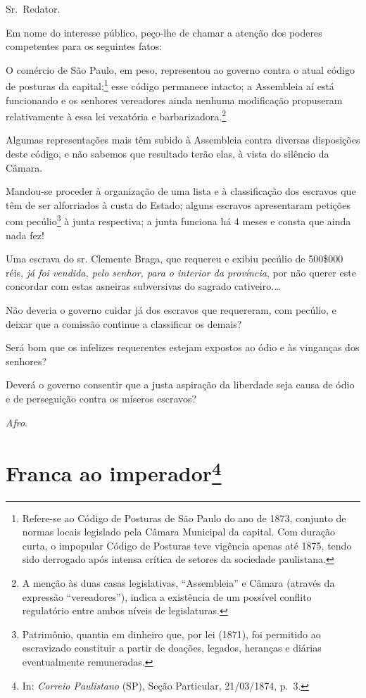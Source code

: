 \asterisc{}

Sr.~Redator.

Em nome do interesse público, peço-lhe de chamar a atenção dos poderes
competentes para os seguintes fatos:

O comércio de São Paulo, em peso, representou ao governo contra o atual
código de posturas da capital;\footnote{ Refere-se ao Código de
  Posturas de São Paulo do ano de 1873, conjunto de normas locais
  legislado pela Câmara Municipal da capital. Com duração curta, o
  impopular Código de Posturas teve vigência apenas até 1875, tendo sido
  derrogado após intensa crítica de setores da sociedade paulistana.}
esse código permanece intacto; a Assembleia aí está funcionando e os
senhores vereadores ainda nenhuma modificação propuseram relativamente à
essa lei vexatória e barbarizadora.\footnote{ A menção às duas casas
  legislativas, ``Assembleia'' e Câmara (através da expressão
  ``vereadores''), indica a existência de um possível conflito regulatório
  entre ambos níveis de legislaturas.}

Algumas representações mais têm subido à Assembleia contra diversas
disposições deste código, e não sabemos que resultado terão elas, à
vista do silêncio da Câmara.

Mandou-se proceder à organização de uma lista e à classificação dos
escravos que têm de ser alforriados à custa do Estado; alguns escravos
apresentaram petições com pecúlio\footnote{ Patrimônio, quantia em
  dinheiro que, por lei (1871), foi permitido ao escravizado constituir
  a partir de doações, legados, heranças e diárias eventualmente
  remuneradas.} à junta respectiva; a junta funciona há 4 meses e consta
que ainda nada fez!

Uma escrava do sr. Clemente Braga, que requereu e exibiu pecúlio de
500\$000 réis, \emph{já foi vendida, pelo senhor, para o interior da
província}, por não querer este concordar com estas asneiras subversivas
do sagrado cativeiro.\ldots{}

Não deveria o governo cuidar já dos escravos que requereram, com
pecúlio, e deixar que a comissão continue a classificar os demais?

Será bom que os infelizes requerentes estejam expostos ao ódio e às
vinganças dos senhores?

Deverá o governo consentir que a justa aspiração da liberdade seja causa
de ódio e de perseguição contra os míseros escravos?

\emph{Afro}.

\chapter{Franca ao imperador\footnote{ In: \emph{Correio Paulistano} (SP), Seção Particular,
  21/03/1874, p.~3.}} %

